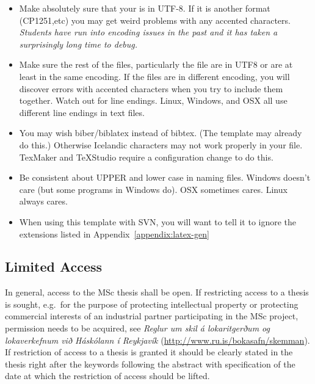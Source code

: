 \begin{itemize}
\item Make absolutely sure that your  is in UTF-8.  If it is another format (CP1251,etc) you may get weird problems with any accented characters.
  {\em Students have run into encoding issues in the past and it has taken a surprisingly long time to debug.}

\item Make sure the rest of the files, particularly the  file are in UTF8 or are at least in the same encoding.
  If the files are in different encoding, you will discover errors with accented characters when you try to include them together.
  Watch out for line endings. Linux, Windows, and OSX all use different line endings in text files.

\item You may wish biber/biblatex instead of bibtex.
(The template may already do this.)
Otherwise Icelandic characters may not work properly in your  file.
TexMaker and TeXStudio require a configuration change to do this.

\item Be consistent about UPPER and lower case in naming files.
  Windows doesn't care (but some programs in Windows do).
  OSX sometimes cares.
  Linux always cares.
\item When using this template with SVN, you will want to tell it to ignore the extensions listed in Appendix~\ref{appendix:latex-gen}
\end{itemize}

\subsection{Limited Access}
In general, access to the MSc thesis shall be open.
If restricting access to a thesis is sought, e.g.\ for the purpose of protecting intellectual property or protecting commercial interests of an industrial partner participating in the MSc project, permission needs to be acquired, see {\em Reglur um skil á lokaritgerðum og lokaverkefnum við Háskólann í Reykjavík\/} (\url{http://www.ru.is/bokasafn/skemman}).
If restriction of access to a thesis is granted it should be clearly stated in the thesis right after the keywords following the abstract with specification of the date at which the restriction of access should be lifted.


